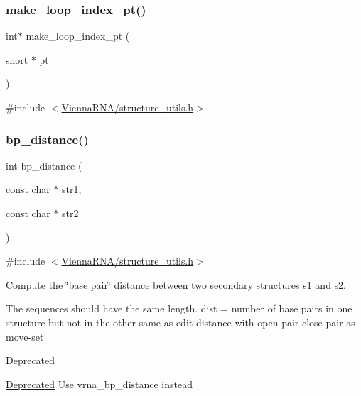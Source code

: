 \subsubsection{\texorpdfstring{make\+\_\+loop\+\_\+index\+\_\+pt()}{make\_loop\_index\_pt()}}
{\footnotesize\ttfamily int$\ast$ make\+\_\+loop\+\_\+index\+\_\+pt (\begin{DoxyParamCaption}\item[{short $\ast$}]{pt }\end{DoxyParamCaption})}



{\ttfamily \#include $<$\mbox{\hyperlink{structure__utils_8h}{Vienna\+R\+N\+A/structure\+\_\+utils.\+h}}$>$}

\mbox{\label{group__struct__utils_ga6ebbcd29a754f0e4f1a66d1fd84184db}} 
\subsubsection{\texorpdfstring{bp\+\_\+distance()}{bp\_distance()}}
{\footnotesize\ttfamily int bp\+\_\+distance (\begin{DoxyParamCaption}\item[{const char $\ast$}]{str1,  }\item[{const char $\ast$}]{str2 }\end{DoxyParamCaption})}



{\ttfamily \#include $<$\mbox{\hyperlink{structure__utils_8h}{Vienna\+R\+N\+A/structure\+\_\+utils.\+h}}$>$}



Compute the \char`\"{}base pair\char`\"{} distance between two secondary structures s1 and s2. 

The sequences should have the same length. dist = number of base pairs in one structure but not in the other same as edit distance with open-\/pair close-\/pair as move-\/set

\begin{DoxyRefDesc}{Deprecated}
\item[\mbox{\hyperlink{deprecated__deprecated000144}{Deprecated}}]Use vrna\+\_\+bp\+\_\+distance instead \end{DoxyRefDesc}

